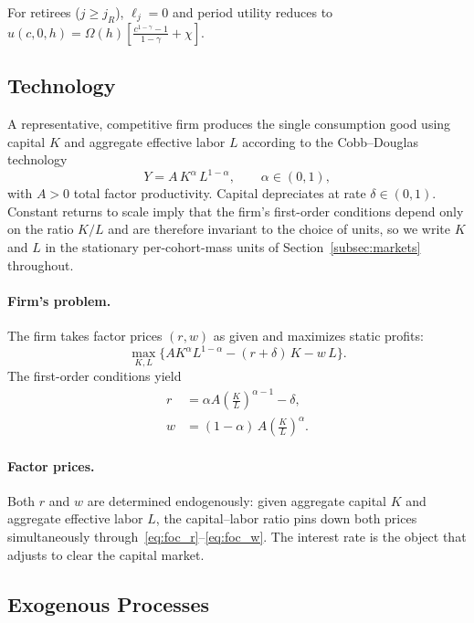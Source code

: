 \documentclass[12pt,a4paper]{article}
\begin{document}
For retirees ($j \geq j_R$), $\ell_j = 0$ and period utility reduces to $u(c, 0, h) = \Omega(h)\left[\frac{c^{1-\gamma} - 1}{1-\gamma} + \chi\right]$.


\subsection{Technology}
\label{subsec:technology}

A representative, competitive firm produces the single consumption good using capital $K$ and aggregate effective labor $L$ according to the Cobb--Douglas technology
\begin{equation}
\label{eq:production}
Y = A\, K^\alpha\, L^{1-\alpha}, \qquad \alpha \in (0,1),
\end{equation}
with $A > 0$ total factor productivity. Capital depreciates at rate $\delta \in (0,1)$. Constant returns to scale imply that the firm's first-order conditions depend only on the ratio $K/L$ and are therefore invariant to the choice of units, so we write $K$ and $L$ in the stationary per-cohort-mass units of Section~\ref{subsec:markets} throughout.

\paragraph{Firm's problem.}
The firm takes factor prices $(r, w)$ as given and maximizes static profits:
\begin{equation}
\label{eq:firm_problem}
\max_{K, L} \bigl\{A K^\alpha L^{1-\alpha} - (r+\delta)\,K - w\,L\bigr\}.
\end{equation}
The first-order conditions yield
\begin{align}
r &= \alpha A \left(\frac{K}{L}\right)^{\alpha-1} - \delta, \label{eq:foc_r} \\
w &= (1-\alpha)\, A \left(\frac{K}{L}\right)^{\alpha}. \label{eq:foc_w}
\end{align}

\paragraph{Factor prices.}
Both $r$ and $w$ are determined endogenously: given aggregate capital $K$ and aggregate effective labor $L$, the capital--labor ratio pins down both prices simultaneously through~\eqref{eq:foc_r}--\eqref{eq:foc_w}. The interest rate is the object that adjusts to clear the capital market.


\subsection{Exogenous Processes}
\label{subsec:exogenous}
\end{document}
